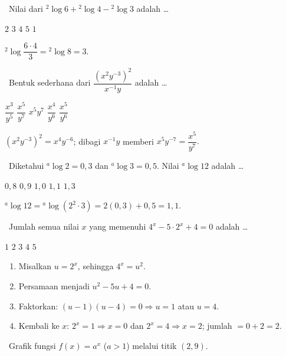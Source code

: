 \documentclass[11pt,a4paper]{exam}
\newenvironment{langkah}{%
  \begin{enumerate}[label=\textbf{Langkah \arabic*:},leftmargin=2.6em,
    itemsep=2pt,topsep=2pt]}{\end{enumerate}}
\newcommand{\Inter}{{\footnotesize\textsf{\textcolor{biru}{[Intermediate]}}}\ }
\newcommand{\Adv}{{\footnotesize\textsf{\textcolor{oranye}{[Advanced]}}}\ }
\begin{document}
\begin{questions}
\question \Inter Nilai dari ${}^{2}\!\log 6 + {}^{2}\!\log 4 - {}^{2}\!\log 3$ adalah \dots
\begin{choices}
\choice $2$ \CorrectChoice $3$ \choice $4$ \choice $5$ \choice $1$
\end{choices}
\begin{solution}${}^{2}\!\log\dfrac{6\cdot 4}{3} = {}^{2}\!\log 8 = 3.$\end{solution}

\question \Inter Bentuk sederhana dari $\dfrac{(x^{2}y^{-3})^{2}}{x^{-1}y}$ adalah \dots
\begin{choices}
\choice $\dfrac{x^{3}}{y^{5}}$ \CorrectChoice $\dfrac{x^{5}}{y^{7}}$
\choice $x^{5}y^{7}$ \choice $\dfrac{x^{4}}{y^{6}}$ \choice $\dfrac{x^{5}}{y^{6}}$
\end{choices}
\begin{solution}$(x^{2}y^{-3})^{2}=x^{4}y^{-6}$; dibagi $x^{-1}y$ memberi
$x^{5}y^{-7} = \dfrac{x^{5}}{y^{7}}.$\end{solution}

\question \Inter Diketahui ${}^{a}\!\log 2 = 0{,}3$ dan ${}^{a}\!\log 3 = 0{,}5$.
Nilai ${}^{a}\!\log 12$ adalah \dots
\begin{choices}
\choice $0{,}8$ \choice $0{,}9$ \choice $1{,}0$ \CorrectChoice $1{,}1$ \choice $1{,}3$
\end{choices}
\begin{solution}${}^{a}\!\log 12 = {}^{a}\!\log(2^{2}\cdot 3) = 2(0{,}3)+0{,}5 = 1{,}1.$\end{solution}

\question \Adv Jumlah semua nilai $x$ yang memenuhi $4^{x} - 5\cdot 2^{x} + 4 = 0$ adalah \dots
\begin{choices}
\choice $1$ \CorrectChoice $2$ \choice $3$ \choice $4$ \choice $5$
\end{choices}
\begin{solution}
\begin{langkah}
\item Misalkan $u = 2^{x}$, sehingga $4^{x} = u^{2}$.
\item Persamaan menjadi $u^{2} - 5u + 4 = 0$.
\item Faktorkan: $(u-1)(u-4)=0 \Rightarrow u = 1$ atau $u = 4$.
\item Kembali ke $x$: $2^{x}=1 \Rightarrow x=0$ dan $2^{x}=4 \Rightarrow x=2$; jumlah $=0+2=2$.
\end{langkah}
\end{solution}

\question \Adv Grafik fungsi $f(x) = a^{x}$ ($a>1$) melalui titik $(2,9)$.


\end{questions}
\end{document}
